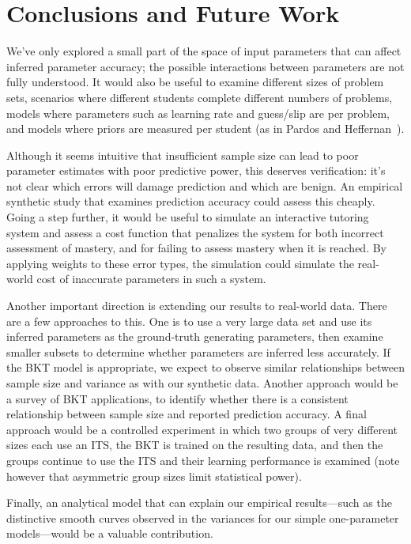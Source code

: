 \documentclass{edm_template}
\begin{document}
\section{Conclusions and Future Work}

We've only explored a small part of the space of input parameters that can affect inferred parameter accuracy; the possible interactions between parameters are not fully understood. It would also be useful
to examine different sizes of problem sets, scenarios where different students complete different numbers
of problems, models where parameters such as learning rate and guess/slip are per problem, and models where priors are measured per student (as in Pardos and Heffernan~\cite{conf/um/PardosH10}).

Although it seems intuitive that insufficient sample size can lead to poor parameter estimates with poor predictive power, this deserves verification: it's not clear which errors will damage prediction and which are benign. An empirical synthetic study that examines prediction accuracy could assess this cheaply. Going a step further, it would be useful to simulate an interactive tutoring system and assess a cost function that penalizes the system for both incorrect assessment of mastery, and for failing to assess mastery when it is reached. By applying weights to these error types, the simulation could simulate the real-world cost of inaccurate parameters in such a system.

Another important direction is extending our results to real-world data. There are a few approaches to this. One is to use a very large data set and use its inferred parameters as the ground-truth generating parameters, then examine smaller subsets to determine whether parameters are inferred less accurately. If the BKT model is appropriate, we expect to observe similar relationships between sample size and variance as with our synthetic data. Another approach would be a survey of BKT applications, to identify whether there is a consistent relationship between sample size and reported prediction accuracy. A final approach would be a controlled experiment in which two groups of very different sizes each use an ITS, the BKT is trained on the resulting data, and then the groups continue to use the ITS and their learning performance is examined (note however that asymmetric group sizes limit statistical power).

Finally, an analytical model that can explain our empirical results---such as the distinctive smooth curves observed in the variances for our simple one-parameter models---would be a valuable contribution.




\end{document}
